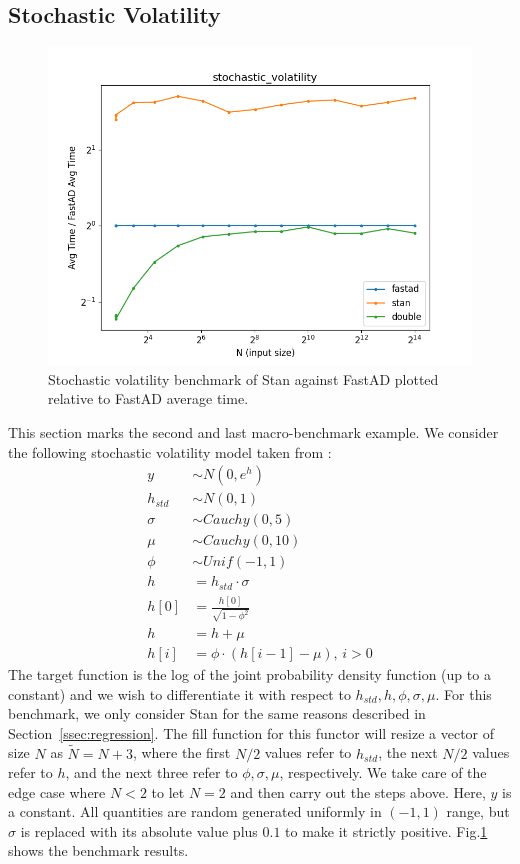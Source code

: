 \subsection{Stochastic Volatility}

\begin{figure}[t]
    \centering
    \includegraphics[width=\textwidth]{figs/stochastic_volatility_fig.png}
    \caption{%
        Stochastic volatility benchmark of Stan against FastAD 
        plotted relative to FastAD average time.
    }\label{fig:stochastic_volatility}
\end{figure}

This section marks the second and last macro-benchmark example.
We consider the following stochastic volatility model 
taken from :
\begin{align*}
    y &\sim N(0, e^{h}) \\
    h_{std} &\sim N(0, 1) \\
    \sigma &\sim Cauchy(0,5) \\
    \mu &\sim Cauchy(0,10) \\
    \phi &\sim Unif(-1, 1) \\
    h &= h_{std} \cdot \sigma \\
    h[0] &= \frac{h[0]}{\sqrt{1 - \phi^2}} \\
    h &= h + \mu \\
    h[i] &= \phi \cdot (h[i-1] - \mu),\, i > 0
\end{align*}
The target function is the log of the joint probability density function (up to a constant)
and we wish to differentiate it with respect to $h_{std}, h, \phi, \sigma, \mu$.
For this benchmark, we only consider Stan for the same reasons described in Section~\ref{ssec:regression}.
The fill function for this functor will resize a vector of size $N$ as $\tilde{N} = N + 3$,
where the first $N/2$ values refer to $h_{std}$,
the next $N/2$ values refer to $h$,
and the next three refer to $\phi, \sigma, \mu$, respectively.
We take care of the edge case where $N < 2$ to let $N = 2$ and then carry out the steps above.
Here, $y$ is a constant.
All quantities are random generated uniformly in $(-1,1)$ range,
but $\sigma$ is replaced with its absolute value plus $0.1$ to make it strictly positive.
Fig.\ref{fig:stochastic_volatility} shows the benchmark results.

